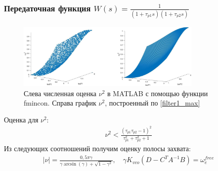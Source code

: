 \documentclass{beamer}
\begin{document}
\begin{frame}
\frametitle{Передаточная функция $W(s) = \frac{1}{(1+\tau_{p1}s)(1+\tau_{p2}s)}$}
  \begin{figure}[H] 
  \includegraphics[width=0.8\textwidth]{images/agregated.eps}
\caption{Слева численная оценка $\nu^2$ в MATLAB с помощью функции fmincon. Справа график $\nu^2$, построенный по \eqref{filter1_max}}
\end{figure}\vspace{-2mm}
Оценка для $\nu^2$:\vspace{-2mm}
\begin{equation}\label{filter1_max}
 \begin{aligned}
\nu^2 < \frac{(\tau_{p1}\tau_{p2} - 1)^2}{\tau_{p1}^2 + \tau_{p2}^2 + 1}
 \end{aligned}
\end{equation}
Из следующих соотношений получим оценку полосы захвата:
 \begin{equation}
 \begin{aligned}
\mid\nu\mid = \frac{0,5\pi\gamma}{\gamma \operatorname{arcsin} (\gamma) + \sqrt{1-\gamma^2}}, \quad \gamma K_{vco}\left(D-C^T A^{-1}B\right)  = \omega_e^{free}
 \end{aligned}
\end{equation}
\end{frame}

\end{document}
